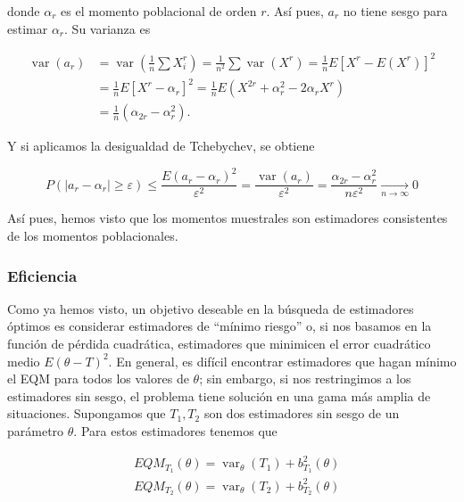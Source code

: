 \documentclass[
]{article}
\begin{document}
donde \(\alpha_{r}\) es el momento poblacional de orden \(r\). Así pues, \(a_{r}\) no tiene sesgo para estimar \(\alpha_{r}\). Su varianza es

\[
\begin{aligned}
\operatorname{var}\left(a_{r}\right) & =\operatorname{var}\left(\frac{1}{n} \sum X_{i}^{r}\right)=\frac{1}{n^{2}} \sum \operatorname{var}\left(X^{r}\right)=\frac{1}{n} E\left[X^{r}-E\left(X^{r}\right)\right]^{2} \\
& =\frac{1}{n} E\left[X^{r}-\alpha_{r}\right]^{2}=\frac{1}{n} E\left(X^{2 r}+\alpha_{r}^{2}-2 \alpha_{r} X^{r}\right) \\
& =\frac{1}{n}\left(\alpha_{2 r}-\alpha_{r}^{2}\right) .
\end{aligned}
\]

Y si aplicamos la desigualdad de Tchebychev, se obtiene

\[
P\left(\left|a_{r}-\alpha_{r}\right| \geq \varepsilon\right) \leq \frac{E\left(a_{r}-\alpha_{r}\right)^{2}}{\varepsilon^{2}}=\frac{\operatorname{var}\left(a_{r}\right)}{\varepsilon^{2}}=\frac{\alpha_{2 r}-\alpha_{r}^{2}}{n \varepsilon^{2}} \underset{n \rightarrow \infty}{\longrightarrow} 0
\]

Así pues, hemos visto que los momentos muestrales son estimadores consistentes de los momentos poblacionales.

\subsubsection{Eficiencia}\label{eficiencia}

Como ya hemos visto, un objetivo deseable en la búsqueda de estimadores óptimos es considerar estimadores de ``mínimo riesgo'' o, si nos basamos en la función de pérdida cuadrática, estimadores que minimicen el error cuadrático medio \(E(\theta-T)^{2}\).
En general, es difícil encontrar estimadores que hagan mínimo el EQM para todos los valores de \(\theta\); sin embargo, si nos restringimos a los estimadores sin sesgo, el problema tiene solución en una gama más amplia de situaciones. Supongamos que \(T_{1}, T_{2}\) son dos estimadores sin sesgo de un parámetro \(\theta\). Para estos estimadores tenemos que

\[
\begin{aligned}
& E Q M_{T_{1}}(\theta)=\operatorname{var}_{\theta}\left(T_{1}\right)+b_{T_{1}}^{2}(\theta) \\
& E Q M_{T_{2}}(\theta)=\operatorname{var}_{\theta}\left(T_{2}\right)+b_{T_{2}}^{2}(\theta)
\end{aligned}
\]
\end{document}
